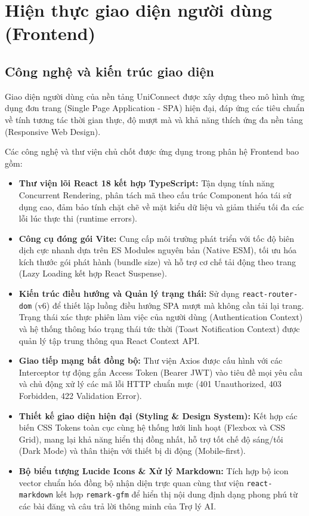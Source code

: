 \chapter{Hiện thực giao diện người dùng (Frontend)}

\section{Công nghệ và kiến trúc giao diện}
Giao diện người dùng của nền tảng UniConnect được xây dựng theo mô hình ứng dụng đơn trang (Single Page Application - SPA) hiện đại, đáp ứng các tiêu chuẩn về tính tương tác thời gian thực, độ mượt mà và khả năng thích ứng đa nền tảng (Responsive Web Design).

Các công nghệ và thư viện chủ chốt được ứng dụng trong phân hệ Frontend bao gồm:
\begin{itemize}
    \item \textbf{Thư viện lõi React 18 kết hợp TypeScript:} Tận dụng tính năng Concurrent Rendering, phân tách mã theo cấu trúc Component hóa tái sử dụng cao, đảm bảo tính chặt chẽ về mặt kiểu dữ liệu và giảm thiểu tối đa các lỗi lúc thực thi (runtime errors).
    \item \textbf{Công cụ đóng gói Vite:} Cung cấp môi trường phát triển với tốc độ biên dịch cực nhanh dựa trên ES Modules nguyên bản (Native ESM), tối ưu hóa kích thước gói phát hành (bundle size) và hỗ trợ cơ chế tải động theo trang (Lazy Loading kết hợp React Suspense).
    \item \textbf{Kiến trúc điều hướng và Quản lý trạng thái:} Sử dụng \texttt{react-router-dom} (v6) để thiết lập luồng điều hướng SPA mượt mà không cần tải lại trang. Trạng thái xác thực phiên làm việc của người dùng (Authentication Context) và hệ thống thông báo trạng thái tức thời (Toast Notification Context) được quản lý tập trung thông qua React Context API.
    \item \textbf{Giao tiếp mạng bất đồng bộ:} Thư viện Axios được cấu hình với các Interceptor tự động gắn Access Token (Bearer JWT) vào tiêu đề mọi yêu cầu và chủ động xử lý các mã lỗi HTTP chuẩn mực (401 Unauthorized, 403 Forbidden, 422 Validation Error).
    \item \textbf{Thiết kế giao diện hiện đại (Styling \& Design System):} Kết hợp các biến CSS Tokens toàn cục cùng hệ thống lưới linh hoạt (Flexbox và CSS Grid), mang lại khả năng hiển thị đồng nhất, hỗ trợ tốt chế độ sáng/tối (Dark Mode) và thân thiện với thiết bị di động (Mobile-first).
    \item \textbf{Bộ biểu tượng Lucide Icons \& Xử lý Markdown:} Tích hợp bộ icon vector chuẩn hóa đồng bộ nhận diện trực quan cùng thư viện \texttt{react-markdown} kết hợp \texttt{remark-gfm} để hiển thị nội dung định dạng phong phú từ các bài đăng và câu trả lời thông minh của Trợ lý AI.
\end{itemize}

